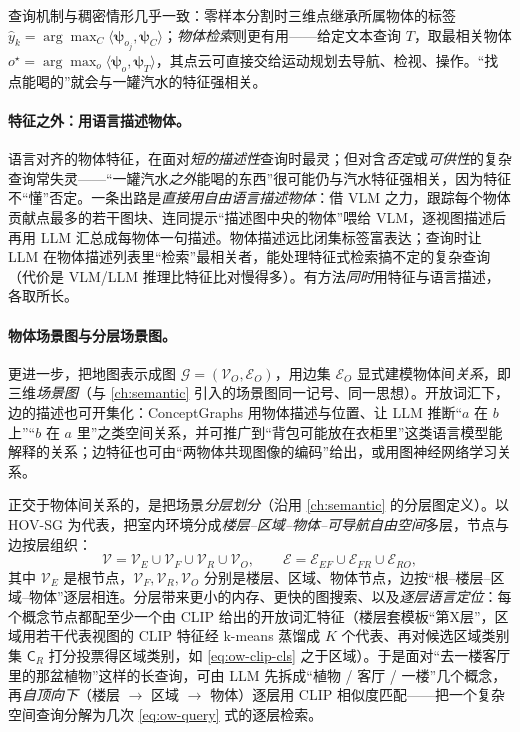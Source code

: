 \noindent 查询机制与稠密情形几乎一致：零样本分割时三维点继承所属物体的标签 $\hat{y}_k=\arg\max_{C}\langle\boldsymbol\psi_{o_j},\boldsymbol\psi_C\rangle$；\emph{物体检索}则更有用——给定文本查询 $T$，取最相关物体 $o^\star=\arg\max_{o}\langle\boldsymbol\psi_o,\boldsymbol\psi_T\rangle$，其点云可直接交给运动规划去导航、检视、操作。“找点能喝的”就会与一罐汽水的特征强相关。

\paragraph{特征之外：用语言描述物体。}
语言对齐的物体特征，在面对\emph{短的描述性}查询时最灵；但对含\emph{否定}或\emph{可供性}的复杂查询常失灵——“一罐汽水\emph{之外}能喝的东西”很可能仍与汽水特征强相关，因为特征不“懂”否定\cite{paull2026openworld}。一条出路是\emph{直接用自由语言描述物体}：借 VLM 之力，跟踪每个物体贡献点最多的若干图块、连同提示“描述图中央的物体”喂给 VLM，逐视图描述后再用 LLM 汇总成每物体一句描述。物体描述远比闭集标签富表达；查询时让 LLM 在物体描述列表里“检索”最相关者，能处理特征式检索搞不定的复杂查询（代价是 VLM/LLM 推理比特征比对慢得多）。有方法\emph{同时}用特征与语言描述，各取所长。

\paragraph{物体场景图与分层场景图。}
更进一步，把地图表示成图 $\mathcal{G}=(\mathcal{V}_O,\mathcal{E}_O)$，用边集 $\mathcal{E}_O$ 显式建模物体间\emph{关系}，即三维\emph{场景图}（与 \cref{ch:semantic} 引入的场景图同一记号、同一思想）。开放词汇下，边的描述也可开集化：ConceptGraphs 用物体描述与位置、让 LLM 推断“$a$ 在 $b$ 上”“$b$ 在 $a$ 里”之类空间关系，并可推广到“背包可能放在衣柜里”这类语言模型能解释的关系\cite{gu2024conceptgraphs}；边特征也可由“两物体共现图像的编码”给出，或用图神经网络学习关系。

正交于物体间关系的，是把场景\emph{分层划分}（沿用 \cref{ch:semantic} 的分层图定义）。以 HOV-SG\cite{werby2024hovsg} 为代表，把室内环境分成\emph{楼层--区域--物体--可导航自由空间}多层，节点与边按层组织：
\begin{equation}
  \mathcal{V}=\mathcal{V}_E\cup\mathcal{V}_F\cup\mathcal{V}_R\cup\mathcal{V}_O,\qquad
  \mathcal{E}=\mathcal{E}_{EF}\cup\mathcal{E}_{FR}\cup\mathcal{E}_{RO},
  \label{eq:ow-hsg}
\end{equation}
其中 $\mathcal{V}_E$ 是根节点，$\mathcal{V}_F,\mathcal{V}_R,\mathcal{V}_O$ 分别是楼层、区域、物体节点，边按“根--楼层--区域--物体”逐层相连。分层带来更小的内存、更快的图搜索、以及\emph{逐层语言定位}：每个概念节点都配至少一个由 CLIP 给出的开放词汇特征（楼层套模板“第{X}层”，区域用若干代表视图的 CLIP 特征经 k-means 蒸馏成 $K$ 个代表、再对候选区域类别集 $\mathsf{C}_R$ 打分投票得区域类别，如 \cref{eq:ow-clip-cls} 之于区域）。于是面对“去一楼客厅里的那盆植物”这样的长查询，可由 LLM 先拆成“植物 / 客厅 / 一楼”几个概念，再\emph{自顶向下}（楼层 $\to$ 区域 $\to$ 物体）逐层用 CLIP 相似度匹配——把一个复杂空间查询分解为几次 \cref{eq:ow-query} 式的逐层检索。

